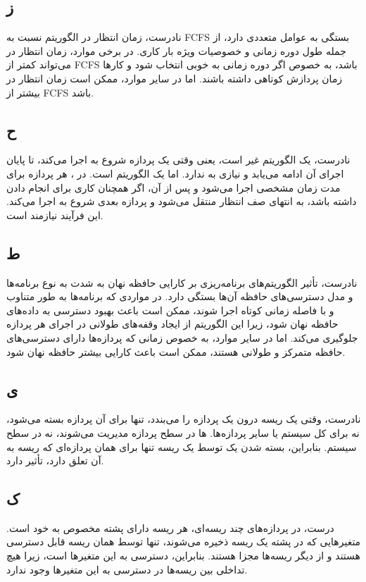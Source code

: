 \subsection*{ز}
نادرست، زمان انتظار در الگوریتم  نسبت به FCFS بستگی به عوامل متعددی دارد، از جمله طول دوره زمانی  و خصوصیات ویژه بار کاری. در برخی موارد، زمان انتظار در  می‌تواند کمتر از FCFS باشد، به خصوص اگر دوره زمانی به خوبی انتخاب شود و کارها زمان پردازش کوتاهی داشته باشند. اما در سایر موارد، ممکن است زمان انتظار در  بیشتر از FCFS باشد.

\subsection*{ح}
نادرست،   یک الگوریتم غیر  است، یعنی وقتی یک پردازه شروع به اجرا می‌کند، تا پایان اجرای آن ادامه می‌یابد و نیازی به  ندارد. اما  یک الگوریتم  است. در ، هر پردازه برای مدت زمان مشخصی  اجرا می‌شود و پس از آن، اگر همچنان کاری برای انجام دادن داشته باشد، به انتهای صف انتظار منتقل می‌شود و پردازه بعدی شروع به اجرا می‌کند. این فرآیند نیازمند  است.

\subsection*{ط}
نادرست، تأثیر الگوریتم‌های برنامه‌ریزی بر کارایی حافظه نهان به شدت به نوع برنامه‌ها و مدل دسترسی‌های حافظه آن‌ها بستگی دارد. در مواردی که برنامه‌ها به طور متناوب و با فاصله زمانی کوتاه اجرا شوند، ممکن است  باعث بهبود دسترسی به داده‌های حافظه نهان شود، زیرا این الگوریتم از ایجاد وقفه‌های طولانی در اجرای هر پردازه جلوگیری می‌کند. اما در سایر موارد، به خصوص زمانی که پردازه‌ها دارای دسترسی‌های حافظه متمرکز و طولانی هستند،  ممکن است باعث کارایی بیشتر حافظه نهان شود.

\subsection*{ی}
نادرست، وقتی یک ریسه درون یک پردازه  را می‌بندد، تنها برای آن پردازه بسته می‌شود، نه برای کل سیستم یا سایر پردازه‌ها.  ها در سطح پردازه مدیریت می‌شوند، نه در سطح سیستم. بنابراین، بسته شدن یک  توسط یک ریسه تنها برای همان پردازه‌ای که ریسه به آن تعلق دارد، تأثیر دارد.

\subsection*{ک}
درست، در پردازه‌های چند ریسه‌ای، هر ریسه دارای پشته  مخصوص به خود است. متغیرهایی که در پشته یک ریسه ذخیره می‌شوند، تنها توسط همان ریسه قابل دسترسی هستند و از دیگر ریسه‌ها مجزا هستند. بنابراین، دسترسی به این متغیرها  است، زیرا هیچ تداخلی بین ریسه‌ها در دسترسی به این متغیرها وجود ندارد.

